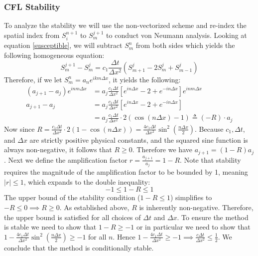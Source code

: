 \subsubsection{CFL Stability}
To analyze the stability we will use the non-vectorized scheme and re-index the spatial index from $S^{n+1}_i$ to $S^{j+1}_m$ to conduct von Neumann analysis. Looking at equation \ref{susceptible}, we will subtract $S^n_m$ from both sides which yields the following homogeneous equation: 
\begin{equation}
    S_m^{j+1} - S_m^j = c_1 \frac{\Delta t}{\Delta x^2} (S_{m+1}^j - 2S_m^j + S_{m-1}^j) 
\end{equation}
Therefore, if we let $S_m^n = a_n e^{i k m \Delta x}$, it yields the following:
\begin{align}
    (a_{j+1} - a_j) e^{i n m \Delta x} &= a_j \frac{c_1 \Delta t}{\Delta x^2} [e^{i n \Delta x} - 2 + e^{-i n \Delta x}] e^{i n m \Delta x} \\
    a_{j+1} - a_j &= a_j \frac{c_1 \Delta t}{\Delta x^2} [e^{i n \Delta x} - 2 + e^{-i n \Delta x}] \\
    &= a_j \frac{c_1 \Delta t}{\Delta x^2} \cdot 2 (\cos(n \Delta x) - 1) \triangleq (-R) \cdot a_j 
\end{align}
Now since $R = \frac{c_1 \Delta t}{\Delta x^2} \cdot 2(1-\cos(n\Delta x)) = \frac{4 c_1 \Delta t}{\Delta x^2} \sin^2\left(\frac{n\Delta x}{2}\right)$. 
Because $c_1, \Delta t$, and $\Delta x$ are strictly positive physical constants, and the squared sine function is always non-negative, it follows that $R \geq 0$. Therefore we have $a_{j+1} = (1-R)a_j$. Next we define the amplification factor $r = \frac{a_{j+1}}{a_j} = 1 - R$.  Note that stability requires the magnitude of the amplification factor to be bounded by 1, meaning $|r| \leq 1$, which expands to the double inequality:
\begin{equation}
    -1 \leq 1-R \leq 1
\end{equation}
The upper bound of the stability condition ($1 - R \leq 1$) simplifies to $-R \leq 0 \implies R \geq 0$. As established above, $R$ is inherently non-negative. Therefore, the upper bound is satisfied for all choices of $\Delta t$ and $\Delta x$. To ensure the method is stable we need to show that $1- R \geq -1$ or in particular we need to show that $1 - \frac{4 c_1 \Delta t}{\Delta x^2} \sin^2\left(\frac{n\Delta x}{2}\right) \geq -1$ for all $n$. Hence $1 - \frac{4 c_1 \Delta t}{\Delta x^2}  \geq -1 \implies \frac{c \Delta t}{\Delta x^2} \leq \frac{1}{2}$. We conclude that the method is conditionally stable. 


